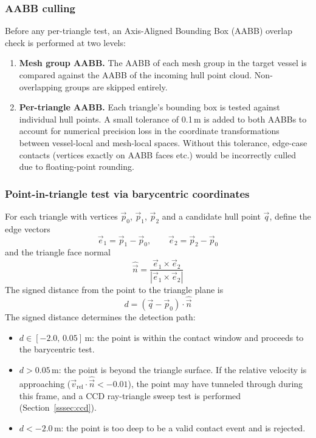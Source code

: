 \documentclass[Orbiter Technical Reference.tex]{subfiles}
\begin{document}
\subsubsection{AABB culling}
Before any per-triangle test, an Axis-Aligned Bounding Box (AABB) overlap
check is performed at two levels:

\begin{enumerate}
\item \textbf{Mesh group AABB.} The AABB of each mesh group in the target
      vessel is compared against the AABB of the incoming hull point cloud.
      Non-overlapping groups are skipped entirely.
\item \textbf{Per-triangle AABB.} Each triangle's bounding box is tested
against individual hull points. A small tolerance of 0.1\,m is added
to both AABBs to account for numerical precision loss in the
coordinate transformations between vessel-local and mesh-local spaces.
Without this tolerance, edge-case contacts (vertices exactly on AABB
faces etc.) would be incorrectly culled due to floating-point rounding.
\end{enumerate}

\subsubsection{Point-in-triangle test via barycentric coordinates}
\label{sssec:barycentric}
For each triangle with vertices $\vec{p}_0$, $\vec{p}_1$, $\vec{p}_2$
and a candidate hull point $\vec{q}$, define the edge vectors
\begin{equation*}
\vec{e}_1 = \vec{p}_1 - \vec{p}_0, \qquad
\vec{e}_2 = \vec{p}_2 - \vec{p}_0
\end{equation*}
and the triangle face normal
\begin{equation*}
\hat{\vec{n}} = \frac{\vec{e}_1 \times \vec{e}_2}{|\vec{e}_1 \times \vec{e}_2|}
\end{equation*}
The signed distance from the point to the triangle plane is
\begin{equation}
d = (\vec{q} - \vec{p}_0) \cdot \hat{\vec{n}}
\label{eq:signed_dist}
\end{equation}
The signed distance determines the detection path:
\begin{itemize}
\item $d \in [-2.0,\, 0.05]$\,m: the point is within the contact window
  and proceeds to the barycentric test.
\item $d > 0.05$\,m: the point is beyond the triangle surface.  If the
  relative velocity is approaching ($\vec{v}_{\mathrm{rel}} \cdot
  \hat{\vec{n}} < -0.01$), the point may have tunneled through during
  this frame, and a CCD ray-triangle sweep test is performed
  (Section~\ref{sssec:ccd}).
\item $d < -2.0$\,m: the point is too deep to be a valid contact event
  and is rejected.
\end{itemize}
\end{document}

